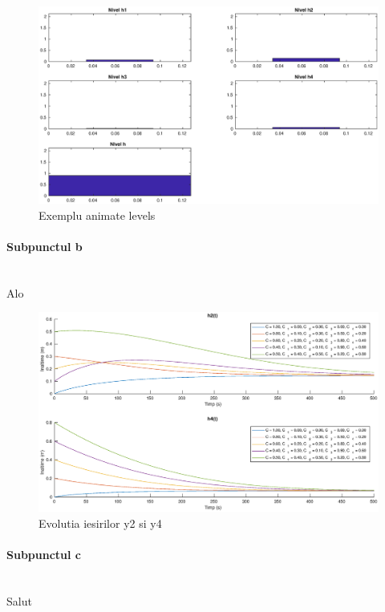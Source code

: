 \documentclass[12pt,english]{article}
\newcommand{\myparagraph}[1]{\paragraph{#1}\mbox{}\\}
\begin{document}
\begin{center}
	\begin{figure} [htbp]
		\includegraphics[width=1\textwidth]{a_1.eps}
		\caption{Exemplu animate levels}
	\end{figure}
\end{center}

\myparagraph {Subpunctul b}
Alo

\begin{figure} [htbp]
	\includegraphics[width=1\textwidth]{b_1.eps}
	\caption{Evolutia iesirilor y2 si y4}
\end{figure}

\myparagraph {Subpunctul c}
Salut
\end{document}
